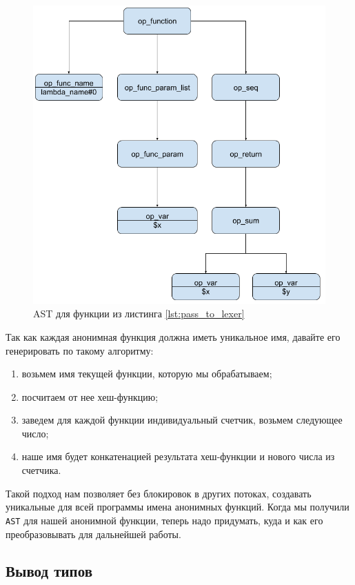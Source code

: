 \begin{figure}[H]
    \caption{AST для функции из листинга \ref{lst:pass_to_lexer}}
    \label{fig:AST_for_sum}
    \centering
    \includegraphics[width=\linewidth]{images/ast_for_id}
\end{figure}

Так как каждая анонимная функция должна иметь уникальное имя, давайте его генерировать по такому алгоритму:
\begin{enumerate}
  \item возьмем имя текущей функции, которую мы обрабатываем;
  \item посчитаем от нее хеш-функцию;
  \item заведем для каждой функции индивидуальный счетчик, возьмем следующее число;
  \item наше имя будет конкатенацией результата хеш-функции и нового числа из счетчика.
\end{enumerate}

Такой подход нам позволяет без блокировок в других потоках, создавать уникальные для всей программы имена анонимных функций.
Когда мы получили \verb|AST| для нашей анонимной функции, теперь надо придумать, куда и как его преобразовывать для дальнейшей работы.

\subsection{Вывод типов}
